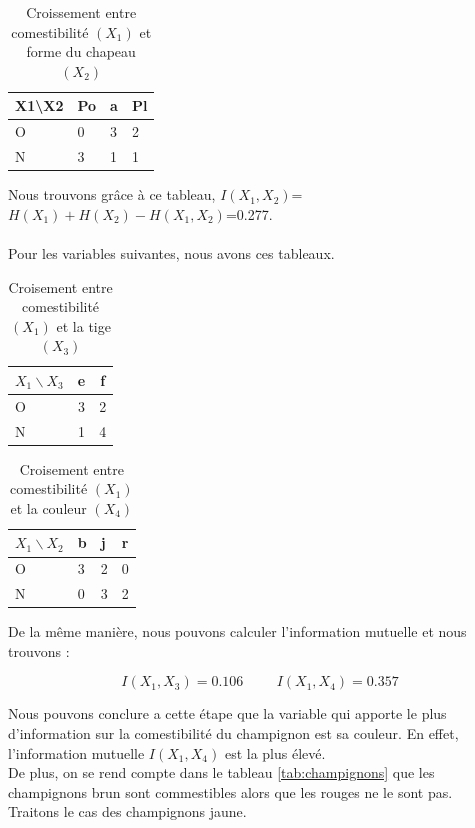 \documentclass{article}
\begin{document}
\begin{table}[H]
  \centering
    \caption{Croissement entre comestibilité $(X_1)$ et forme du chapeau $(X_2)$}
    \begin{tabular}{|l|l|l|l|}
    \hline
    X1\textbackslash{}X2 & Po & a & Pl \\ \hline
    O                    & 0  & 3 & 2  \\ \hline
    N                    & 3  & 1 & 1  \\ \hline
    \end{tabular}
\end{table}
Nous trouvons grâce à ce tableau, $I(X_1,X_2)$=$H(X_1)+H(X_2)-H(X_1,X_2)$=0.277.
\\\\
Pour les variables suivantes, nous avons ces tableaux.

\begin{table}[H]
  \centering
    \caption{Croisement entre comestibilité $(X_1)$ et la tige $(X_3)$}
    \begin{tabular}{|l|c|c|}
    \hline
    $X_1 \backslash X_3$ & e & f \\ \hline
    O                    & 3  & 2  \\ \hline
    N                    & 1  & 4  \\ \hline
    \end{tabular}
\end{table}

\begin{table}[H]
  \centering
    \caption{Croisement entre comestibilité $(X_1)$ et la couleur $(X_4)$}
    \begin{tabular}{|l|l|l|l|}
      \hline
      $X_1\backslash X_2$ & b & j & r \\ \hline
      O                    & 3  & 2 & 0  \\ \hline
      N                    & 0  & 3 & 2  \\ \hline
      \end{tabular}
\end{table}

De la même manière, nous pouvons calculer l'information mutuelle et nous trouvons :




\[
  I(X_1,X_3)=0.106 \hspace{1cm} I(X_1,X_4)=0.357
\]




Nous pouvons conclure a cette étape que la variable qui apporte le plus d'information sur la comestibilité du champignon est sa couleur. En effet, l'information mutuelle $I(X_1,X_4)$ est la plus élevé.
\\
De plus, on se rend compte dans le tableau \ref{tab:champignons} que les champignons brun sont commestibles alors que les rouges ne le sont pas.
\\
Traitons le cas des champignons jaune.
    
\end{document}
